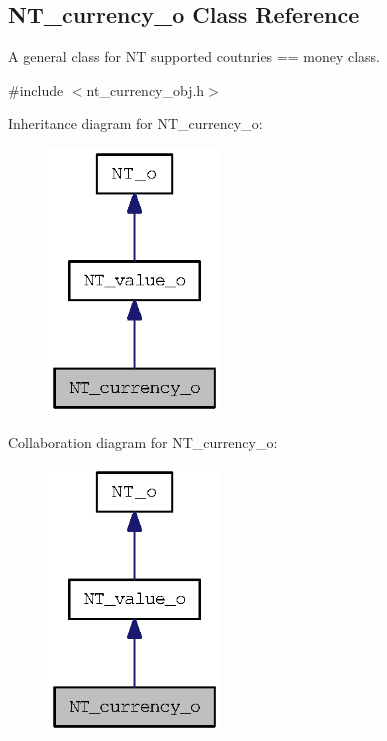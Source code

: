 \subsection{NT\_\-currency\_\-o Class Reference}
\label{class_n_t__currency__o}


A general class for NT supported coutnries == money class.  




{\ttfamily \#include $<$nt\_\-currency\_\-obj.h$>$}



Inheritance diagram for NT\_\-currency\_\-o:
\nopagebreak
\begin{figure}[H]
\begin{center}
\leavevmode
\includegraphics[width=130pt]{class_n_t__currency__o__inherit__graph}
\end{center}
\end{figure}


Collaboration diagram for NT\_\-currency\_\-o:
\nopagebreak
\begin{figure}[H]
\begin{center}
\leavevmode
\includegraphics[width=130pt]{class_n_t__currency__o__coll__graph}
\end{center}
\end{figure}
